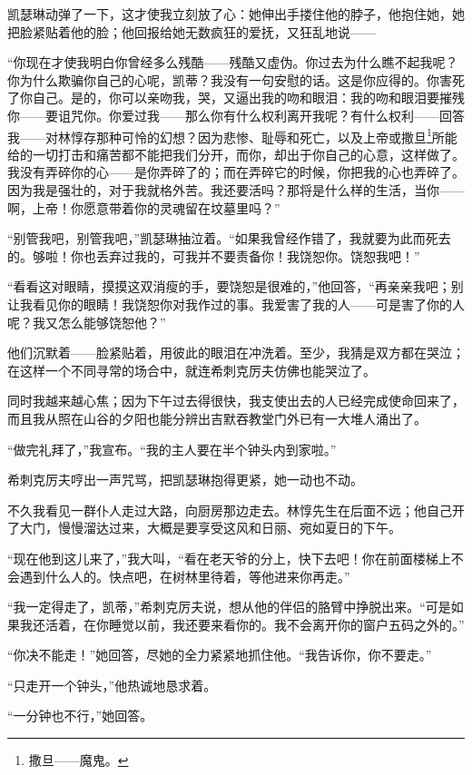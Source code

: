 \par 凯瑟琳动弹了一下，这才使我立刻放了心：她伸出手搂住他的脖子，他抱住她，她把脸紧贴着他的脸；他回报给她无数疯狂的爱抚，又狂乱地说——
\par “你现在才使我明白你曾经多么残酷——残酷又虚伪。你过去为什么瞧不起我呢？你为什么欺骗你自己的心呢，凯蒂？我没有一句安慰的话。这是你应得的。你害死了你自己。是的，你可以亲吻我，哭，又逼出我的吻和眼泪：我的吻和眼泪要摧残你——要诅咒你。你爱过我——那么你有什么权利离开我呢？有什么权利——回答我——对林惇存那种可怜的幻想？因为悲惨、耻辱和死亡，以及上帝或撒旦\footnote{撒旦——魔鬼。}所能给的一切打击和痛苦都不能把我们分开，而你，却出于你自己的心意，这样做了。我没有弄碎你的心——是你弄碎了的；而在弄碎它的时候，你把我的心也弄碎了。因为我是强壮的，对于我就格外苦。我还要活吗？那将是什么样的生活，当你——啊，上帝！你愿意带着你的灵魂留在坟墓里吗？”
\par “别管我吧，别管我吧，”凯瑟琳抽泣着。“如果我曾经作错了，我就要为此而死去的。够啦！你也丢弃过我的，可我并不要责备你！我饶恕你。饶恕我吧！”
\par “看看这对眼睛，摸摸这双消瘦的手，要饶恕是很难的，”他回答，“再亲亲我吧；别让我看见你的眼睛！我饶恕你对我作过的事。我爱害了我的人——可是害了你的人呢？我又怎么能够饶恕他？”
\par 他们沉默着——脸紧贴着，用彼此的眼泪在冲洗着。至少，我猜是双方都在哭泣；在这样一个不同寻常的场合中，就连希刺克厉夫仿佛也能哭泣了。
\par 同时我越来越心焦；因为下午过去得很快，我支使出去的人已经完成使命回来了，而且我从照在山谷的夕阳也能分辨出吉默吞教堂门外已有一大堆人涌出了。
\par “做完礼拜了，”我宣布。“我的主人要在半个钟头内到家啦。”
\par 希刺克厉夫哼出一声咒骂，把凯瑟琳抱得更紧，她一动也不动。
\par 不久我看见一群仆人走过大路，向厨房那边走去。林惇先生在后面不远；他自己开了大门，慢慢溜达过来，大概是要享受这风和日丽、宛如夏日的下午。
\par “现在他到这儿来了，”我大叫，“看在老天爷的分上，快下去吧！你在前面楼梯上不会遇到什么人的。快点吧，在树林里待着，等他进来你再走。”
\par “我一定得走了，凯蒂，”希刺克厉夫说，想从他的伴侣的胳臂中挣脱出来。“可是如果我还活着，在你睡觉以前，我还要来看你的。我不会离开你的窗户五码之外的。”
\par “你决不能走！”她回答，尽她的全力紧紧地抓住他。“我告诉你，你不要走。”
\par “只走开一个钟头，”他热诚地恳求着。
\par “一分钟也不行，”她回答。
